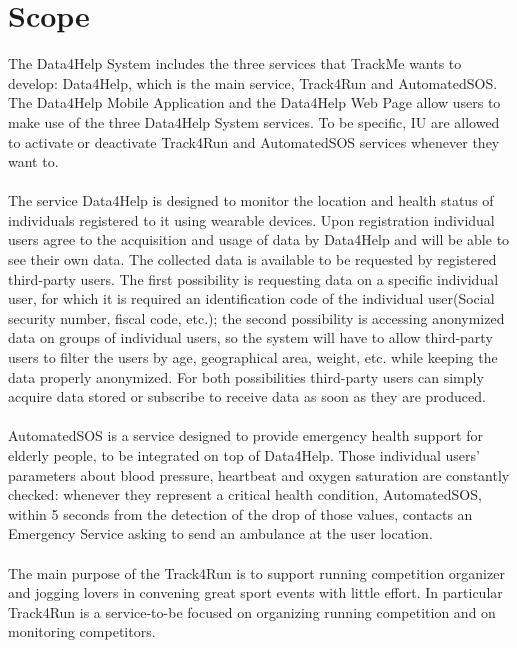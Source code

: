 \section{Scope}
The Data4Help System includes the three services that TrackMe wants to develop: Data4Help, which is the main service, Track4Run and AutomatedSOS. The Data4Help Mobile Application and the Data4Help Web Page allow users to make use of the three Data4Help System services. To be specific, IU are allowed to activate or deactivate Track4Run and AutomatedSOS services whenever they want to. \\
\\
The service Data4Help is designed to monitor the location and health status of individuals registered to it using wearable devices. Upon registration individual users agree to the acquisition and usage of data by Data4Help and will be able to see their own data.
The collected data is available to be requested by registered third-party users. The first possibility is requesting data on a specific individual user, for which it is required an identification code of the individual user(Social security number, fiscal code, etc.); the second possibility is accessing anonymized data on groups of individual users, so the system will have to allow third-party users to filter the users by age, geographical area, weight, etc. while keeping the data properly anonymized.
For both possibilities third-party users can simply acquire data stored or subscribe to receive data as soon as they are produced.\\
\\
AutomatedSOS is a service designed to provide emergency health support for elderly people, to be integrated on top of Data4Help. Those individual users’ parameters about blood pressure, heartbeat and oxygen saturation are constantly checked: whenever they represent a critical health condition, AutomatedSOS, within 5 seconds from the detection of the drop of those values, contacts an Emergency Service asking to send an ambulance at the user location.\\
\\
The main purpose of the Track4Run is to support running competition organizer and jogging lovers in convening great sport events with little effort. In particular Track4Run is a service-to-be focused on organizing running competition and on monitoring competitors. \\
\\
